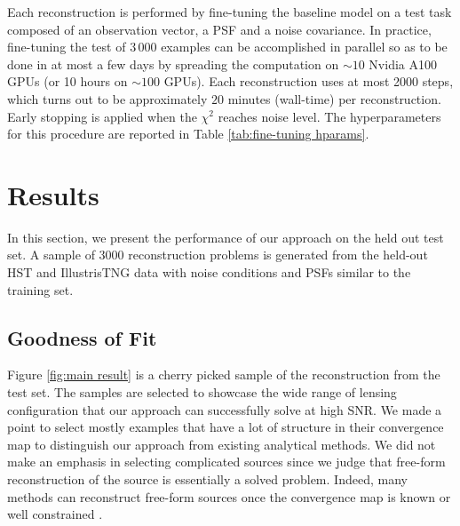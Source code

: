 Each reconstruction is performed by fine-tuning the baseline model 
on a test task composed of an observation vector, a PSF and a noise covariance.
In practice, fine-tuning the test of $3\,000$ examples can be accomplished in parallel so as to be done in at most a few days by spreading the computation on $\sim 10$ Nvidia A100 GPUs (or 10 hours on $\sim 100$ GPUs). Each reconstruction uses at most 2000 steps, which turns out to be approximately $20$ minutes (wall-time) per reconstruction. Early stopping is applied when the $\chi^2$ reaches noise level. The hyperparameters for this procedure are reported in Table \ref{tab:fine-tuning hparams}.



\section{Results}\label{sec:results}


In this section, we present the performance of our approach 
on the held out test set. A sample of 3000 reconstruction 
problems is generated from the held-out HST and IllustrisTNG data 
with noise conditions and PSFs similar to the training set.

\subsection{Goodness of Fit}
Figure \ref{fig:main result} is a cherry picked sample of the reconstruction from the test set. 
The samples are selected to showcase the wide range of lensing configuration that 
our approach can successfully solve at high SNR. We made a point to select mostly 
examples that have a lot of structure in their convergence map to distinguish 
our approach from existing analytical methods. We did not make an 
emphasis in selecting complicated sources since we judge that 
free-form reconstruction of the source is essentially a solved problem. 
Indeed, many methods can reconstruct free-form sources 
once the convergence map is known or well constrained 
\citep{Warren2003,Suyu2006,Vegetti2009,Birrer2018,Morningstar2019,Galan2021,Karchev2022,Mishra-Sharma2022}.

